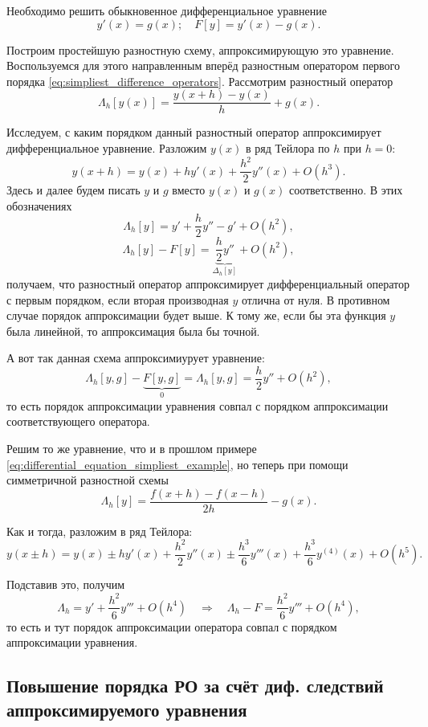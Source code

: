 \documentclass[../main.tex]{subfile}
\begin{document}
\begin{example}\label{eq:differential_equation_simpliest_example}
	Необходимо решить обыкновенное дифференциальное уравнение
	\[y'(x)=g(x);\quad F[y]=y'(x)-g(x).\]

	Построим простейшую разностную схему, аппроксимирующую это уравнение.
	Воспользуемся для этого направленным вперёд разностным оператором
	первого порядка \eqref{eq:simpliest_difference_operators}. Рассмотрим
	разностный оператор
	\[\Lambda_h[y(x)]=\frac{y(x+h)-y(x)}{h}+g(x).\]

	Исследуем, с каким порядком данный разностный оператор аппроксимирует
	дифференциальное уравнение. Разложим $y(x)$ в ряд Тейлора по $h$ при
	$h=0$:
	\[y(x+h)=y(x)+hy'(x)+\frac{h^2}{2}y''(x)+O(h^3).\]
	Здесь и далее будем писать $y$ и $g$ вместо $y(x)$ и $g(x)$
	соответственно. В этих обозначениях
	\[\Lambda_h[y]=y'+\frac{h}{2}y''-g'+O(h^2),\]
	\[\Lambda_h[y]-F[y]=\underset{\Delta_h[y]}{\underbrace{\frac{h}{2}y''}}
	+O(h^2),\]
	получаем, что разностный оператор аппроксимирует дифференциальный
	оператор с первым порядком, если вторая производная $y$ отлична от нуля.
	В противном случае порядок аппроксимации будет выше. К тому же, если бы
	эта функция $y$ была линейной, то аппроксимация была бы точной.

	А вот так данная схема аппроксимиурует уравнение:
	\[\Lambda_h[y,g]-\underset{0}{\underbrace{F[y,g]}}=\Lambda_h[y,g]=
	\frac{h}{2}y''+O(h^2),\]
	то есть порядок аппроксимации уравнения совпал с порядком аппроксимации
	соответствующего оператора.
\end{example}

\begin{example}\label{eq:differential_equation_central_example}
	Решим то же уравнение, что и в прошлом примере
	\eqref{eq:differential_equation_simpliest_example}, но теперь при помощи
	симметричной разностной схемы
	\[\Lambda_h[y]=\frac{f(x+h)-f(x-h)}{2h}-g(x).\]

	Как и тогда, разложим в ряд Тейлора:
	\[y(x\pm h)=y(x)\pm hy'(x)+\frac{h^2}{2}y''(x)\pm\frac{h^3}{6}y'''(x)+
	\frac{h^3}{6}y^{(4)}(x)+O(h^5).\]

	Подставив это, получим
	\[\Lambda_h=y'+\frac{h^2}{6}y'''+O(h^4)\quad\Rightarrow\quad
	\Lambda_h-F=\frac{h^2}{6}y'''+O(h^4),\]
	то есть и тут порядок аппроксимации оператора совпал с порядком
	аппроксимации уравнения.
\end{example}

\subsection{Повышение порядка РО за счёт диф. следствий аппроксимируемого
уравнения}
\end{document}
